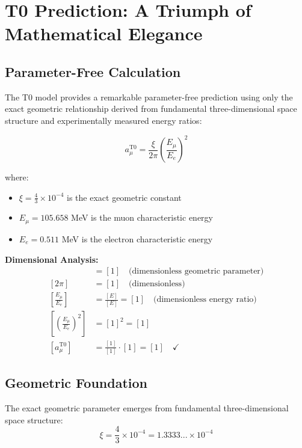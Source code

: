 \documentclass[12pt,a4paper]{report}
\begin{document}
\section{T0 Prediction: A Triumph of Mathematical Elegance}
\label{sec:t0_prediction}

\subsection{Parameter-Free Calculation}
\label{subsec:parameter_free}

The T0 model provides a remarkable parameter-free prediction using only the exact geometric relationship derived from fundamental three-dimensional space structure and experimentally measured energy ratios:

\begin{equation}
	\boxed{a_\mu^{\text{T0}} = \frac{\xi}{2\pi} \left(\frac{E_\mu}{E_e}\right)^2}
	\label{eq:t0_muon_formula}
\end{equation}

where:
\begin{itemize}
	\item $\xi = \frac{4}{3} \times 10^{-4}$ is the exact geometric constant
	\item $E_\mu = 105.658$ MeV is the muon characteristic energy
	\item $E_e = 0.511$ MeV is the electron characteristic energy
\end{itemize}

\textbf{Dimensional Analysis:}
\begin{align}
	[\xi] &= [1] \quad \text{(dimensionless geometric parameter)} \\
	[2\pi] &= [1] \quad \text{(dimensionless)} \\
	\left[\frac{E_\mu}{E_e}\right] &= \frac{[E]}{[E]} = [1] \quad \text{(dimensionless energy ratio)} \\
	\left[\left(\frac{E_\mu}{E_e}\right)^2\right] &= [1]^2 = [1] \\
	[a_\mu^{\text{T0}}] &= \frac{[1]}{[1]} \cdot [1] = [1] \quad \checkmark
\end{align}

\subsection{Geometric Foundation}
\label{subsec:geometric_foundation}

The exact geometric parameter emerges from fundamental three-dimensional space structure:
\begin{equation}
	\xi = \frac{4}{3} \times 10^{-4} = 1.3333... \times 10^{-4}
\end{equation}
\end{document}
